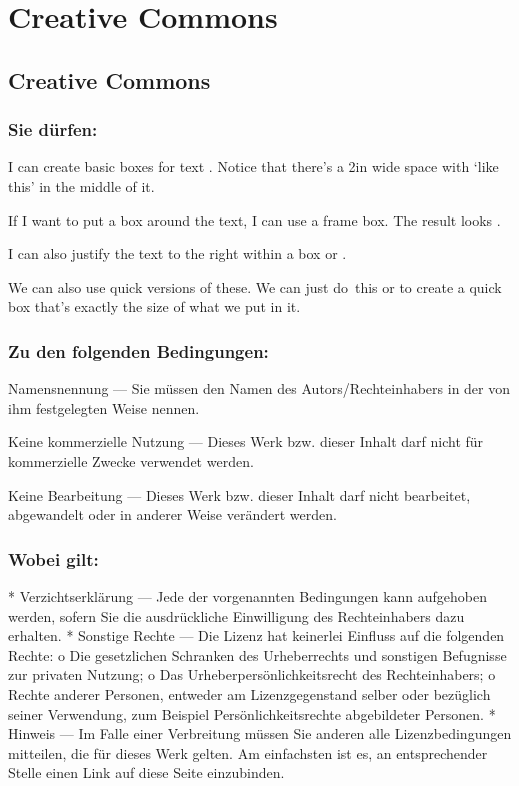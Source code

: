 \chapter*{Creative Commons}
\section*{Creative Commons}
\subsection*{Sie dürfen:}

I can create basic boxes for text . Notice
that there's a 2in wide space with `like this' in the middle of it.

If I want to put a box around the text, I can use a frame box. The
result looks .

I can also justify the text to the right within a box
 or .

We can also use quick versions of these. We can just \mbox{do this}
or  to create a quick box that's exactly the size of what we put in it.




\subsection*{Zu den folgenden Bedingungen:}
Namensnennung — Sie müssen den Namen des Autors/Rechteinhabers in der von ihm festgelegten Weise nennen.

Keine kommerzielle Nutzung — Dieses Werk bzw. dieser Inhalt darf nicht für kommerzielle Zwecke verwendet werden.

Keine Bearbeitung — Dieses Werk bzw. dieser Inhalt darf nicht bearbeitet, abgewandelt oder in anderer Weise verändert werden.

\subsection*{Wobei gilt:}
    *   Verzichtserklärung  — Jede der vorgenannten Bedingungen kann aufgehoben werden, sofern Sie die ausdrückliche Einwilligung des Rechteinhabers dazu erhalten.
    * Sonstige Rechte — Die Lizenz hat keinerlei Einfluss auf die folgenden Rechte:
          o Die gesetzlichen Schranken des Urheberrechts und sonstigen Befugnisse zur privaten Nutzung;
          o Das Urheberpersönlichkeitsrecht des Rechteinhabers;
          o Rechte anderer Personen, entweder am Lizenzgegenstand selber oder bezüglich seiner Verwendung, zum Beispiel Persönlichkeitsrechte abgebildeter Personen.
    * Hinweis — Im Falle einer Verbreitung müssen Sie anderen alle Lizenzbedingungen mitteilen, die für dieses Werk gelten. Am einfachsten ist es, an entsprechender Stelle einen Link auf diese Seite einzubinden.

